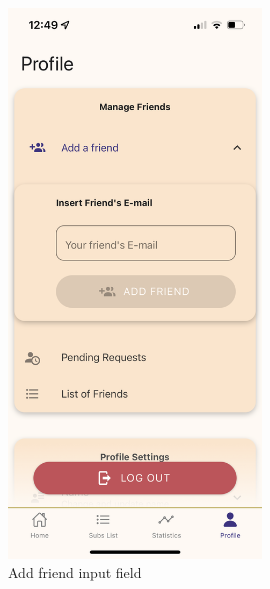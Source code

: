 \documentclass[12pt]{article}
\begin{document}
\begin{figure}[h!]
    \centering
    \begin{minipage}[c]{0.45\textwidth}
        \centering
        \includegraphics[width=0.6\textwidth, clip]{../../assets/smartphone/profileAdd.PNG}
        \caption{Add friend input field}
        \label{fig:profileAdd}
    \end{minipage}\hspace{1cm}%
    \begin{minipage}[c]{0.45\textwidth}
        \centering

\end{minipage}
\end{figure}
\end{document}
